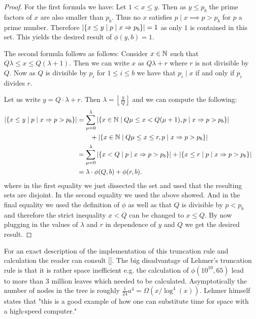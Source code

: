 \begin{proof}
	For the first formula we have:
	Let $1 < x \leq y$. Then as $y \leq p_{b}$ the prime factors of $x$ are also smaller than $p_{b}$.
	Thus no $x$ satisfies $p \mid x \implies p > p_{b}$ for $p$ a prime number. Therefore
	$\abs{\{x \leq y \mid p\mid x \Rightarrow p_{b}\} } = 1$ as only $1$ is contained in this set.
	This yields the desired result of $\phi(y,b) = 1$.

	The second formula follows as follows:
	Consider $x \in \mathbb{N}$ such that $Q \lambda \leq x \leq Q (\lambda+1)$. Then we can write $x$ as
	$Q \lambda + r$ where $r$ is not divisible by $Q$.
	Now as $Q$ is divisible by $p_{i}$ for $1 \leq i \leq b$ we have that $p_{i} \mid x$ if and only if
	$p_{i}$ divides $r$. 

	Let us write $y = Q \cdot \lambda + r$. Then $\lambda = \left\lfloor \frac{y}{Q} \right\rfloor $ and we can compute the following:
	\begin{align*}
		\abs{\{x \leq y \mid p\mid x \Rightarrow p > p_{b}\}} &= \sum_{\mu=0}^{\lambda} \abs{\{x \in \mathbb{N} \mid Q\mu \leq x < Q(\mu+1), p \mid x \Rightarrow p > p_{b}\}}\\ 
		&\qquad+ \abs{\{x \in \mathbb{N} \mid Q\mu \leq x \leq r, p \mid x \Rightarrow p > p_{b}\}} \\
		&= \sum_{\mu = 0}^{\lambda} \abs{\{x < Q \mid p \mid x \Rightarrow p > p_{b}\}} + \abs{\{x \leq r \mid p \mid x \Rightarrow p > p_{b}\} }\\
		&=  \lambda \cdot \phi(Q,b) + \phi(r,b)
	.\end{align*}
	where in the first equality we just dissected the set and used that the resulting sets are disjoint.
	In the second equality we used the above showed. And in the final equality we used the definition of $\phi$ as well as that $Q$ is divisible by $p < p_{b}$
	and therefore the strict inequality $x < Q$ can be changed to $x \leq Q$.
	By now plugging in the values of $\lambda$ and $r$ in dependence of $y$ and $Q$ we get the desired result.
\end{proof}

For an exact description of the implementation of this truncation rule and calculation the reader can consult [].
The big disadvantage of Lehmer's truncation rule is that it is rather space inefficient e.g.
the calculation of $\phi(10^{10},65)$ lead to more than $3$ million leaves which needed to be calculated.
Asymptotically the number of nodes in the tree is roughly $\frac{1}{24} a^{4} = \Omega(x / \log^{4}(x))$.
Lehmer himself states that "this is a good example of how one can substitute time for space with a high-speed computer."

